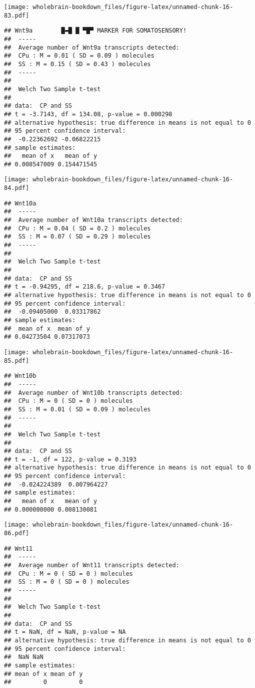 \documentclass[]{book}
\theoremstyle{definition}
\theoremstyle{definition}
\theoremstyle{remark}
\begin{document}
\texttt{[image: wholebrain-bookdown\_files/figure-latex/unnamed-chunk-16-83.pdf]}

\begin{verbatim}
## Wnt9a        █▬█ █ ▀█▀ MARKER FOR SOMATOSENSORY!
##  -----
##  Average number of Wnt9a transcripts detected:
##  CPu : M = 0.01 ( SD = 0.09 ) molecules 
##  SS : M = 0.15 ( SD = 0.43 ) molecules
##  -----
## 
##  Welch Two Sample t-test
## 
## data:  CP and SS
## t = -3.7143, df = 134.08, p-value = 0.000298
## alternative hypothesis: true difference in means is not equal to 0
## 95 percent confidence interval:
##  -0.22362692 -0.06822215
## sample estimates:
##   mean of x   mean of y 
## 0.008547009 0.154471545
\end{verbatim}

\texttt{[image: wholebrain-bookdown\_files/figure-latex/unnamed-chunk-16-84.pdf]}

\begin{verbatim}
## Wnt10a
##  -----
##  Average number of Wnt10a transcripts detected:
##  CPu : M = 0.04 ( SD = 0.2 ) molecules 
##  SS : M = 0.07 ( SD = 0.29 ) molecules
##  -----
## 
##  Welch Two Sample t-test
## 
## data:  CP and SS
## t = -0.94295, df = 218.6, p-value = 0.3467
## alternative hypothesis: true difference in means is not equal to 0
## 95 percent confidence interval:
##  -0.09405000  0.03317862
## sample estimates:
##  mean of x  mean of y 
## 0.04273504 0.07317073
\end{verbatim}

\texttt{[image: wholebrain-bookdown\_files/figure-latex/unnamed-chunk-16-85.pdf]}

\begin{verbatim}
## Wnt10b
##  -----
##  Average number of Wnt10b transcripts detected:
##  CPu : M = 0 ( SD = 0 ) molecules 
##  SS : M = 0.01 ( SD = 0.09 ) molecules
##  -----
## 
##  Welch Two Sample t-test
## 
## data:  CP and SS
## t = -1, df = 122, p-value = 0.3193
## alternative hypothesis: true difference in means is not equal to 0
## 95 percent confidence interval:
##  -0.024224389  0.007964227
## sample estimates:
##   mean of x   mean of y 
## 0.000000000 0.008130081
\end{verbatim}

\texttt{[image: wholebrain-bookdown\_files/figure-latex/unnamed-chunk-16-86.pdf]}

\begin{verbatim}
## Wnt11
##  -----
##  Average number of Wnt11 transcripts detected:
##  CPu : M = 0 ( SD = 0 ) molecules 
##  SS : M = 0 ( SD = 0 ) molecules
##  -----
## 
##  Welch Two Sample t-test
## 
## data:  CP and SS
## t = NaN, df = NaN, p-value = NA
## alternative hypothesis: true difference in means is not equal to 0
## 95 percent confidence interval:
##  NaN NaN
## sample estimates:
## mean of x mean of y 
##         0         0
\end{verbatim}
\end{document}
